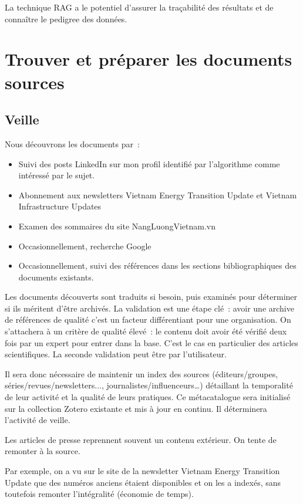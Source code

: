 \documentclass[a4paper,11pt]{report}
\providecommand{\tightlist}{\setlength{\itemsep}{0pt}\setlength{\parskip}{0pt}}
\begin{document}
La technique RAG a le potentiel d'assurer la traçabilité des résultats et de connaître le pedigree des données.

\chapter{Trouver et préparer les documents sources}\label{trouver-et-pruxe9parer-les-documents-sources}

\section{Veille}\label{veille}

Nous découvrons les documents par~:

\begin{itemize}
\tightlist
\item
  Suivi des posts LinkedIn sur mon profil identifié par l'algorithme comme intéressé par le sujet.
\item
  Abonnement aux newsletters Vietnam Energy Transition Update et Vietnam Infrastructure Updates
\item
  Examen des sommaires du site NangLuongVietnam.vn
\item
  Occasionnellement, recherche Google
\item
  Occasionnellement, suivi des références dans les sections bibliographiques des documents existants.
\end{itemize}

Les documents découverts sont traduits si besoin, puis examinés pour déterminer si ils méritent d'être archivés. La validation est une étape clé~: avoir une archive de références de qualité c'est un facteur différentiant pour une organisation. On s'attachera à un critère de qualité élevé~: le contenu doit avoir été vérifié deux fois par un expert pour entrer dans la base. C'est le cas en particulier des articles scientifiques. La seconde validation peut être par l'utilisateur.

Il sera donc nécessaire de maintenir un index des sources (éditeurs/groupes, séries/revues/newsletters..., journalistes/influenceurs\ldots) détaillant la temporalité de leur activité et la qualité de leurs pratiques. Ce métacatalogue sera initialisé sur la collection Zotero existante et mis à jour en continu. Il déterminera l'activité de veille.

Les articles de presse reprennent souvent un contenu extérieur. On tente de remonter à la source.

Par exemple, on a vu sur le site de la newsletter Vietnam Energy Transition Update que des numéros anciens étaient disponibles et on les a indexés, sans toutefois remonter l'intégralité (économie de temps).
\end{document}
